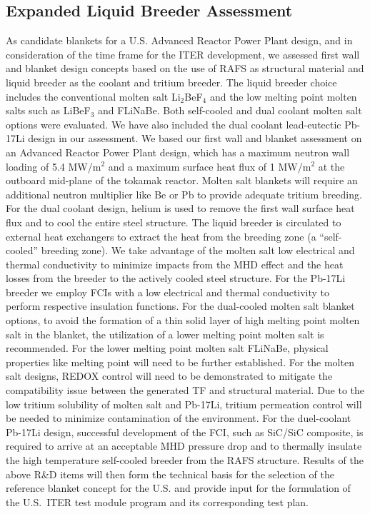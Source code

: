 \subsection{Expanded Liquid Breeder Assessment}

As candidate blankets for a U.S. Advanced Reactor Power Plant design, and in
consideration of the time frame for the ITER development, we assessed first
wall and blanket design concepts based on the use of \gls{RAFS} as structural
material and liquid breeder as the coolant and tritium breeder. The liquid
breeder choice includes the conventional molten salt Li$_2$BeF$_4$ and the low
melting point molten salts such as LiBeF$_3$ and FLiNaBe. Both self-cooled and
dual coolant molten salt options were evaluated. We have also included the
dual coolant lead-eutectic Pb-17Li design in our assessment. We based our
first wall and blanket assessment on an Advanced Reactor Power Plant design,
which has a maximum neutron wall loading of 5.4 MW/m$^2$ and a maximum surface
heat flux of 1 MW/m$^2$ at the outboard mid-plane of the tokamak
reactor. Molten salt blankets will require an additional neutron multiplier
like Be or Pb to provide adequate tritium breeding. For the dual coolant
design, helium is used to remove the first wall surface heat flux and to cool
the entire steel structure. The liquid breeder is circulated to external heat
exchangers to extract the heat from the breeding zone (a “self-cooled”
breeding zone). We take advantage of the molten salt low electrical and
thermal conductivity to minimize impacts from the \gls{MHD} effect and the
heat losses from the breeder to the actively cooled steel structure. For the
Pb-17Li breeder we employ \gls{FCI}s with a low electrical and thermal
conductivity to perform respective insulation functions. For the dual-cooled
molten salt blanket options, to avoid the formation of a thin solid layer of
high melting point molten salt in the blanket, the utilization of a lower
melting point molten salt is recommended.  For the lower melting point molten
salt FLiNaBe, physical properties like melting point will need to be further
established. For the molten salt designs, REDOX control will need to be
demonstrated to mitigate the compatibility issue between the generated
\gls{TF} and structural material. Due to the low tritium solubility of molten
salt and Pb-17Li, tritium permeation control will be needed to minimize
contamination of the environment. For the duel-coolant Pb-17Li design,
successful development of the \gls{FCI}, such as SiC/SiC composite, is
required to arrive at an acceptable \gls{MHD} pressure drop and to thermally
insulate the high temperature self-cooled breeder from the \gls{RAFS}
structure. Results of the above R\&D items will then form the technical basis
for the selection of the reference blanket concept for the U.S. and provide
input for the formulation of the U.S.\ ITER test module program and its
corresponding test plan.

